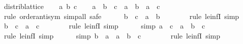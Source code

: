 \begin{isabellebody}
{\isafoldproof}%
%
\isadelimproof
\isanewline
%
\endisadelimproof
\isanewline
{}\isamarkupfalse%
\ distrib{\isacharunderscore}{\kern0pt}lattice\isanewline
%
\isadelimproof
%
\endisadelimproof
%
\isatagproof
{}\isamarkupfalse%
\isanewline
\ \ \isamarkupfalse%
\ a\ b\ c\isanewline
\ \ \isamarkupfalse%
\ {\isachardoublequoteopen}a\ {\isasymsqunion}\ b\ {\isasymsqinter}\ c\ {\isacharequal}{\kern0pt}\ {\isacharparenleft}{\kern0pt}a\ {\isasymsqunion}\ b{\isacharparenright}{\kern0pt}\ {\isasymsqinter}\ {\isacharparenleft}{\kern0pt}a\ {\isasymsqunion}\ c{\isacharparenright}{\kern0pt}{\isachardoublequoteclose}\isanewline
\ \ \isamarkupfalse%
\ {\isacharparenleft}{\kern0pt}rule\ order{\isachardot}{\kern0pt}antisym{\isacharcomma}{\kern0pt}\ simp{\isacharunderscore}{\kern0pt}all{\isacharcomma}{\kern0pt}\ safe{\isacharparenright}{\kern0pt}\isanewline
\ \ \ \ \isamarkupfalse%
\ {\isachardoublequoteopen}b\ {\isasymsqinter}\ c\ {\isasymle}\ a\ {\isasymsqunion}\ b{\isachardoublequoteclose}\isanewline
\ \ \ \ \ \ \isamarkupfalse%
\ {\isacharparenleft}{\kern0pt}rule\ le{\isacharunderscore}{\kern0pt}infI{}{\isacharcomma}{\kern0pt}\ simp{\isacharparenright}{\kern0pt}\isanewline
\ \ \ \ \isamarkupfalse%
\ {\isachardoublequoteopen}b\ {\isasymsqinter}\ c\ {\isasymle}\ a\ {\isasymsqunion}\ c{\isachardoublequoteclose}\isanewline
\ \ \ \ \ \ \isamarkupfalse%
\ {\isacharparenleft}{\kern0pt}rule\ le{\isacharunderscore}{\kern0pt}infI{}{\isacharcomma}{\kern0pt}\ simp{\isacharparenright}{\kern0pt}\isanewline
\ \ \ \ \isamarkupfalse%
\ {\isacharbrackleft}{\kern0pt}simp{\isacharbrackright}{\kern0pt}{\isacharcolon}{\kern0pt}\ {\isachardoublequoteopen}a\ {\isasymsqinter}\ c\ {\isasymle}\ a\ {\isasymsqunion}\ b\ {\isasymsqinter}\ c{\isachardoublequoteclose}\isanewline
\ \ \ \ \ \ \isamarkupfalse%
\ {\isacharparenleft}{\kern0pt}rule\ le{\isacharunderscore}{\kern0pt}infI{}{\isacharcomma}{\kern0pt}\ simp{\isacharparenright}{\kern0pt}\isanewline
\ \ \ \ \isamarkupfalse%
\ {\isacharbrackleft}{\kern0pt}simp{\isacharbrackright}{\kern0pt}{\isacharcolon}{\kern0pt}\ {\isachardoublequoteopen}b\ {\isasymsqinter}\ a\ {\isasymle}\ a\ {\isasymsqunion}\ b\ {\isasymsqinter}\ c{\isachardoublequoteclose}\isanewline
\ \ \ \ \ \ \isamarkupfalse%
\ {\isacharparenleft}{\kern0pt}rule\ le{\isacharunderscore}{\kern0pt}infI{}{\isacharcomma}{\kern0pt}\ simp{\isacharparenright}{\kern0pt}\isanewline

\end{isabellebody}
